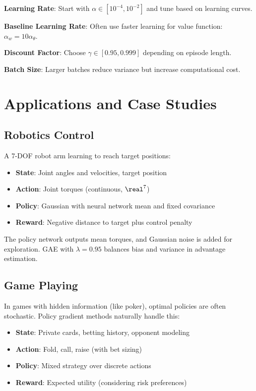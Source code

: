\textbf{Learning Rate}: Start with $\alpha \in [10^{-4}, 10^{-2}]$ and tune based on learning curves.

\textbf{Baseline Learning Rate}: Often use faster learning for value function: $\alpha_w = 10 \alpha_\theta$.

\textbf{Discount Factor}: Choose $\gamma \in [0.95, 0.999]$ depending on episode length.

\textbf{Batch Size}: Larger batches reduce variance but increase computational cost.

\section{Applications and Case Studies}

\subsection{Robotics Control}

\begin{examplebox}
A 7-DOF robot arm learning to reach target positions:
\begin{itemize}
    \item \textbf{State}: Joint angles and velocities, target position
    \item \textbf{Action}: Joint torques (continuous, $\real^7$)
    \item \textbf{Policy}: Gaussian with neural network mean and fixed covariance
    \item \textbf{Reward}: Negative distance to target plus control penalty
\end{itemize}

The policy network outputs mean torques, and Gaussian noise is added for exploration. GAE with $\lambda = 0.95$ balances bias and variance in advantage estimation.
\end{examplebox}

\subsection{Game Playing}

\begin{examplebox}
In games with hidden information (like poker), optimal policies are often stochastic. Policy gradient methods naturally handle this:
\begin{itemize}
    \item \textbf{State}: Private cards, betting history, opponent modeling
    \item \textbf{Action}: Fold, call, raise (with bet sizing)
    \item \textbf{Policy}: Mixed strategy over discrete actions
    \item \textbf{Reward}: Expected utility (considering risk preferences)
\end{itemize}
\end{examplebox}

